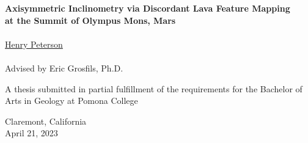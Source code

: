 \begin{titlepage}
    \begin{center}

        \phantom{.}

        \vfill
 
        \large\textbf{Axisymmetric Inclinometry via Discordant Lava Feature Mapping \\ at the Summit of Olympus Mons, Mars}
        \\~\\
        \href{mailto:hgpa2018@mymail.pomona.edu}{Henry Peterson}
        \\~\\
        Advised by Eric Grosfils, Ph.D.

        \vfill
        \vfill
        \vfill

        A thesis submitted in partial fulfillment of the requirements for the Bachelor of Arts in Geology at Pomona College

        \vfill
        \vfill
        \vfill

        Claremont, California\\
        April 21, 2023

    \end{center}
 \end{titlepage}